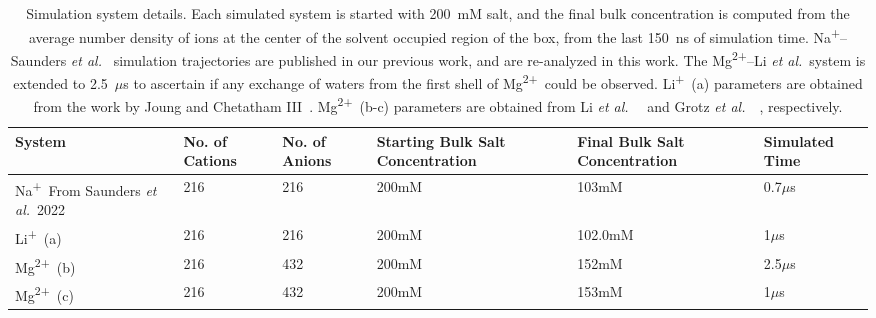 \documentclass[journal=langd5,manuscript=article]{achemso}
\newcommand{\etal}{\textit{et al.}~}
\newcommand{\na}{Na\textsuperscript{+}~}
\newcommand{\li}{Li\textsuperscript{+}~}
\newcommand{\mg}{Mg\textsuperscript{2+}~}
\newcommand{\nambnbfix}{Na\textsuperscript{+}--Saunders \etal}
\newcommand{\mgmbnbfix}{Mg\textsuperscript{2+}--Li \etal} %
\begin{document}
\begin{table}
    \caption{Simulation system details. Each simulated system is started with 200~mM salt, and the final bulk concentration 
    is computed from the average number density of ions 
    at the center of the solvent occupied region of the box, from the last 150~ns of simulation time. \nambnbfix
    simulation trajectories are published in our previous work, and are re-analyzed in this work. 
    The \mgmbnbfix system is extended to 2.5~$\mu$s to ascertain if any 
    exchange of waters from the first shell of \mg could be observed. \li (a) parameters are obtained from 
    the work by Joung and Chetatham III~\cite{joung:2008}. \mg (b-c) parameters
    are obtained from Li \etal~\cite{merzparams} and Grotz \etal~\cite{microparams}, respectively.}
    \label{tab:ions}
    \begin{minipage}{\textwidth}
    \tiny{
    \begin{tabularx}{\textwidth}{X|X|X|X|X|X}
        System & No. of Cations & No. of Anions & Starting Bulk Salt Concentration & Final Bulk Salt Concentration & Simulated Time \\\hline
        \na{\tiny{From Saunders \etal 2022~\cite{saunders:2022}}}      & 216  & 216   &   200mM   & 103mM & 0.7$\mu$s\\\hline
        \li (a)         & 216  & 216   &   200mM   & 102.0mM & 1$\mu$s  \\\hline
        \mg (b)         & 216  & 432   &   200mM   & 152mM  & 2.5$\mu$s\\\hline
        \mg (c)           & 216  & 432   &   200mM   & 153mM & 1$\mu$s\\\hline
    \end{tabularx}}\par
   \vspace{-0.75\skip\footins}
   \renewcommand{\footnoterule}{}
\end{minipage}
\end{table}
\clearpage
\end{document}
